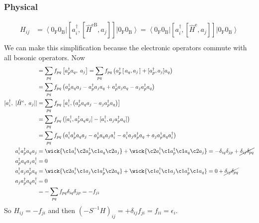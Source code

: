 \subsubsection{Physical} 
\begin{equation}
\begin{split}
    H_{ij} &= \left\langle 0_{\mathrm{F}} 0_{\mathrm{B}}\right|\left[a_i^\dag, \left[\hat{H}^{\mathrm{eB}}, a_j\right]\right]\left|0_{\mathrm{F}} 0_{\mathrm{B}}\right\rangle = \left\langle 0_{\mathrm{F}} 0_{\mathrm{B}}\right|\left[a_i^\dag, \left[\hat{H}^{\mathrm{e}}, a_j\right]\right]\left|0_{\mathrm{F}} 0_{\mathrm{B}}\right\rangle \\
\end{split}
\end{equation}
We can make this simplification because the electronic operators commute with all bosonic operators. Now
\begin{align}
[\hat H^e,\;a_j]
&= \sum_{p q}f_{pq}\,\bigl[a_p^\dagger a_q,\;a_j\bigr]
= \sum_{p q}f_{pq}\left(a_p^\dagger\,[\,a_q,a_j\,]+ [a_p^\dagger, a_j] a_q\right)  \\
&= \sum_{p q}f_{pq}\left(a_p^\dagger a_q a_j - a_p^\dagger a_j a_q + a_p^\dagger a_j a_q -  a_j a_p^\dagger a_q \right) \\
[a_i^\dagger,\;[\hat H^e,\;a_j]] &= \sum_{p q}f_{pq}\,\bigl[a_i^\dagger,\left( a_p^\dagger a_q a_j  -  a_j a_p^\dagger a_q  \right)\bigr] \\
&= \sum_{p q}f_{pq}\,\bigl([a_i^\dagger, a_p^\dagger a_q a_j]  - [a_i^\dagger, a_j a_p^\dagger a_q]\bigr) \\
&= \sum_{p q}f_{pq}\,\bigl(  a_i^\dagger a_p^\dagger a_q a_j - a_p^\dagger a_q a_j a_i^\dagger -a_i^\dag a_j  a_p^\dagger a_q + a_j  a_p^\dagger a_q a_i^\dag \bigr) \\
    a_i^\dagger a_p^\dagger a_q a_j &= \wick{\c1 a_i^\dagger \c2 a_p^\dagger \c1 a_q \c2 a_j} + \wick{\c2 a_i^\dagger \c1 a_p^\dagger \c1 a_q \c2 a_j} = -\delta_{iq} \delta_{jp}+\cancel{\delta_{ij} \delta_{pq}} \\
a_p^\dagger a_q a_j a_i^\dagger &= 0 \\
a_i^\dag a_j a_p^\dagger a_q  &= \wick{\c2 a_i^\dag \c1 a_j \c1 a_p^\dagger \c2 a_q} + \wick{\c1 a_i^\dag \c1 a_j \c1 a_p^\dagger \c1 a_q} = 0 + \cancel{\delta_{ij} \delta_{pq}} \\
a_j a_p^\dagger a_q  a_i^\dagger &= 0 \\
&= - \sum_{p q}f_{pq} \delta_{iq} \delta_{jp} = - f_{ji} 
\end{align}
So ${H_{ij} = -f_{ji}}$ and then $\boxed{(-{S^{-1}H})_{ij} = +\delta_{ij}f_{ji}=f_{ii} = \epsilon_i}$.
